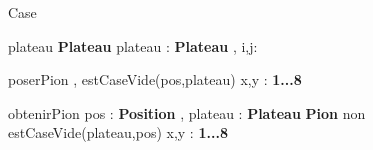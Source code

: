\begin{algorithme}
  \begin{enregistrement}{Case}
  \end{enregistrement}
  
  \vspace*{5mm}
  
\end{algorithme}

\vspace*{5mm}

\begin{algorithme}
\end{algorithme}

\vspace*{5mm}

\begin{algorithme}
  \small
  \fonction
      {plateau}
      {}
      {\textbf{Plateau}}
      {plateau : \textbf{Plateau} , i,j:\naturel}
      {
	     {
	            {
                    }
	     }
      }
\end{algorithme}

\vspace*{5mm}

\begin{algorithme}
  \small
  \procedureAvecPreconditions
      {poserPion}
      { , }
      {estCaseVide(pos,plateau)}
      {x,y : \textbf{1...8}}
      {
      }
\end{algorithme}

\vspace*{5mm}

\begin{algorithme}
  \small
  \fonctionAvecPreconditions
      {obtenirPion}
      {pos : \textbf{Position} , plateau : \textbf{Plateau}}
      {\textbf{Pion}}
      {non estCaseVide(plateau,pos)}
      {x,y : \textbf{1...8}}
      {
      }
\end{algorithme}

